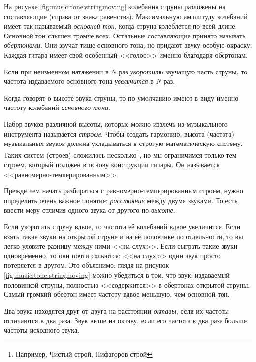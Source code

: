 На рисунке \ref{fig:music:tone:stringmoving} колебания струны разложены на составляющие (справа от знака равенства). Максимальную амплитуду колебаний имеет так называемый \emph{основной тон}, когда струна колеблется по всей длине. Основной тон слышен громче всех. Остальные составляющие принято называть \emph{обертонами}. Они звучат тише основного тона, но придают звуку особую окраску. Каждая гитара имеет свой особенный <<голос>> именно благодаря обертонам.

\begin{Definition}
    Если при неизменном натяжении в $N$ раз \emph{укоротить} звучащую часть струны, то частота издаваемого основного тона \emph{увеличится} в $N$ раз.
\end{Definition}

Когда говорят о высоте звука струны, то по умолчанию имеют в виду именно частоту колебаний \emph{основного тона}.

Набор звуков различной высоты, которые можно извлечь из музыкального инструмента называется \emph{строем}. Чтобы создать гармонию, высота (частота) музыкальных звуков должна укладываться в строгую математическую систему. Таких систем (строев) сложилось несколько\footnote{Например, Чистый строй, Пифагоров строй}, но мы ограничимся только тем строем, который положен в основу конструкции гитары. Он называется <<равномерно-темперированным>>.

Прежде чем начать разбираться с равномерно-темперированным строем, нужно определить очень важное понятие: \emph{расстояние} между двумя звуками. То есть ввести меру отличия одного звука от другого по \emph{высоте}. 

Если укоротить струну вдвое, то частота её колебаний вдвое увеличится. Если взять такие звуки на открытой струне и на её половинке по отдельности, то вы легко уловите разницу между ними <<на слух>>. Если сыграть такие звуки одновременно, то они почти сольются: <<на слух>> один звук просто потеряется в другом. Это объяснимо: глядя на рисунок \ref{fig:music:tone:stringmoving} можно убедиться в том, что звук, издаваемый половинкой струны, полностью <<содержится>> в обертонах открытой струны. Самый громкий обертон имеет частоту вдвое меньшую, чем основной тон. 

\begin{Definition}[Октава]
    Два звука находятся друг от друга на расстоянии \emph{октавы}, если их частоты отличаются в два раза. Звук выше на октаву, если его частота в два раза больше частоты исходного звука. 
\end{Definition}

